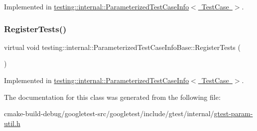 Implemented in \mbox{\hyperlink{classtesting_1_1internal_1_1ParameterizedTestCaseInfo_a16ed77e95a6042c722d0029744acfc33}{testing\+::internal\+::\+Parameterized\+Test\+Case\+Info$<$ Test\+Case $>$}}.

\mbox{\label{classtesting_1_1internal_1_1ParameterizedTestCaseInfoBase_a92baca6c64c822c2e7043217f7903ef2}} 
\subsubsection{\texorpdfstring{RegisterTests()}{RegisterTests()}}
{\footnotesize\ttfamily virtual void testing\+::internal\+::\+Parameterized\+Test\+Case\+Info\+Base\+::\+Register\+Tests (\begin{DoxyParamCaption}{ }\end{DoxyParamCaption})\hspace{0.3cm}{\ttfamily [pure virtual]}}



Implemented in \mbox{\hyperlink{classtesting_1_1internal_1_1ParameterizedTestCaseInfo_a7e118820b3074ce70c0440e2e49a50a1}{testing\+::internal\+::\+Parameterized\+Test\+Case\+Info$<$ Test\+Case $>$}}.



The documentation for this class was generated from the following file\+:\begin{DoxyCompactItemize}
\item 
cmake-\/build-\/debug/googletest-\/src/googletest/include/gtest/internal/\mbox{\hyperlink{gtest-param-util_8h}{gtest-\/param-\/util.\+h}}\end{DoxyCompactItemize}
